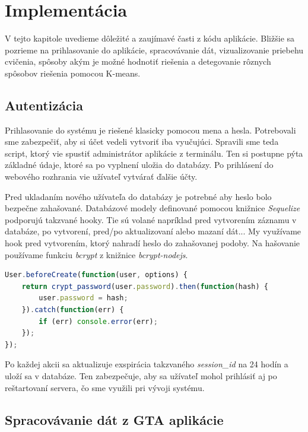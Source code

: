 \chapter{Implementácia}
\label{kap:implementacia}

V tejto kapitole uvedieme dôležité a zaujímavé časti z kódu aplikácie. Bližšie sa pozrieme na prihlasovanie do aplikácie, spracovávanie dát, vizualizovanie priebehu cvičenia, spôsoby akým je možné hodnotiť riešenia a detegovanie rôznych spôsobov riešenia pomocou K-means.

\section{Autentizácia}
\label{sec:authentication}

Prihlasovanie do systému je riešené klasicky pomocou mena a hesla. Potrebovali sme
zabezpečiť, aby si účet vedeli vytvoriť iba vyučujúci. Spravili sme teda script, ktorý
vie spustiť administrátor aplikácie z terminálu. Ten si postupne pýta základné údaje,
ktoré sa po vyplnení uložia do databázy. Po prihlásení do webového rozhrania vie
užívateľ vytvárať ďalšie účty.

Pred ukladaním nového užívateľa do databázy je potrebné aby heslo bolo
bezpečne zahašované. Databázové modely definované pomocou knižnice
\textit{Sequelize} podporujú takzvané hooky. Tie sú volané napríklad
pred vytvorením záznamu v databáze, po vytvorení, pred/po aktualizovaní alebo
mazaní dát... My využívame hook pred vytvorením, ktorý nahradí heslo do zahašovanej
podoby. Na hašovanie používame funkciu \textit{bcrypt} z knižnice
\textit{bcrypt-nodejs}.

\begin{lstlisting}[language=JavaScript]
User.beforeCreate(function(user, options) {
    return crypt_password(user.password).then(function(hash) {
        user.password = hash;
    }).catch(function(err) {
        if (err) console.error(err);
    });
});
\end{lstlisting}

Po každej akcii sa aktualizuje exspirácia takzvaného \textit{session\_id} na 24 hodín
a uloží sa v databáze. Ten zabezpečuje, aby sa užívateľ mohol prihlásiť aj po
reštartovaní servera, čo sme využili pri vývoji systému.

\section{Spracovávanie dát z GTA aplikácie}
\label{sec:gtadataprocessing}

